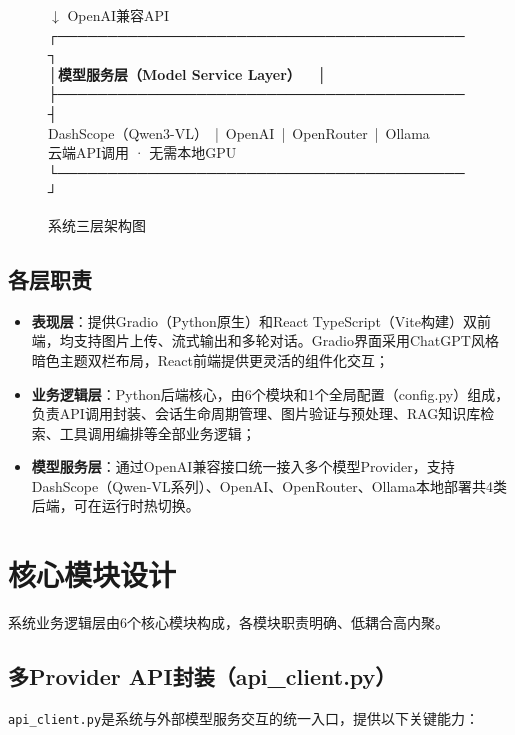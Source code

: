 \begin{figure}[htbp]
{{    \qquad\qquad\qquad\qquad $\downarrow$ OpenAI兼容API\\[3pt]
    \textbf{┌─────────────────────────────────────────┐}\\[2pt]
    \textbf{│\quad 模型服务层（Model Service Layer）\qquad\qquad\ \ │}\\[2pt]
    \textbf{├─────────────────────────────────────────┤}\\[2pt]
    \quad DashScope（Qwen3-VL）\ |\ OpenAI\ |\ OpenRouter\ |\ Ollama\\[2pt]
    \quad 云端API调用 · 无需本地GPU\\[3pt]
    \textbf{└─────────────────────────────────────────┘}
    \vspace{5pt}
  }}
  \caption{系统三层架构图}
  \label{fig:architecture}
\end{figure}

\subsection{各层职责}

\begin{itemize}
  \item \textbf{表现层}：提供Gradio（Python原生）和React TypeScript（Vite构建）双前端，均支持图片上传、流式输出和多轮对话。Gradio界面采用ChatGPT风格暗色主题双栏布局，React前端提供更灵活的组件化交互；
  \item \textbf{业务逻辑层}：Python后端核心，由6个模块和1个全局配置（config.py）组成，负责API调用封装、会话生命周期管理、图片验证与预处理、RAG知识库检索、工具调用编排等全部业务逻辑；
  \item \textbf{模型服务层}：通过OpenAI兼容接口统一接入多个模型Provider，支持DashScope（Qwen-VL系列）、OpenAI、OpenRouter、Ollama本地部署共4类后端，可在运行时热切换。
\end{itemize}

\section{核心模块设计}

系统业务逻辑层由6个核心模块构成，各模块职责明确、低耦合高内聚。

\subsection{多Provider API封装（api\_client.py）}

\texttt{api\_client.py}是系统与外部模型服务交互的统一入口，提供以下关键能力：

